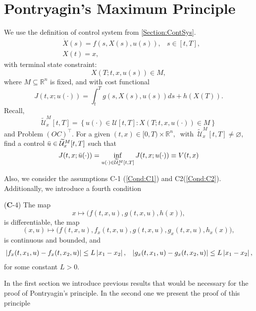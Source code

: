 \chapter{Pontryagin's Maximum Principle}
    We use the definition of control system from \cref{Section:ContSys}.
    \begin{equation} \label{Eq;CtrlSys}
        \begin{aligned}
            &\Dot{X}(s) = f(s, X(s), u(s)), & s\in[t,T], \\
            &X(t) = x,
        \end{aligned}
    \end{equation}
    with terminal state constraint:
    $$
        X(T; t,x,u(s)) \in M,
    $$
    where $M \subseteq \mathbb{R}^{n}$ is fixed, and with cost functional
    $$
        J(t,x;u(\cdot)) = \int_{t}^{T} g(s, X(s), u(s))ds + h(X(T)).
    $$
    Recall,
    $$
        \widetilde{\mathcal{U}}_{x}^{M}[t,T] = \left\{ u(\cdot) \in \mathcal{U}[t,T] : %
        X(T; t,x,u(\cdot)) \in M \right\}
    $$
    and
    Problem $(OC)^\top$. For a given $(t,x) \in [0,T) \times \mathbb{R}^{n}, \ $ %
    with $ \ \widetilde{\mathcal{U}}_{x}^{M}[t,T] \neq \varnothing$, find a control %
    $\Bar{u} \in \widetilde{\mathcal{U}}_{x}^{M}[t,T]$ such that 
    \begin{equation*}
        J(t,x; \Bar{u}(\cdot)) = \inf_{u(\cdot) \in %
        \widetilde{\mathcal{U}}_{x}^{M}[t,T] } %
        J(t,x; u(\cdot)) \equiv V(t,x)    
    \end{equation*}
    
    Also, we consider the assumptions C-1 (\ref{Cond:C1}) and C2(\ref{Cond:C2}).
    Additionally, we introduce a fourth condition
    \begin{asparaenum}
        \item[(\textbf{C}-4)] The map 
        \begin{equation*}
            x \mapsto \big(f(t,x,u), g(t,x,u), h(x) \big),
        \end{equation*}
        is differentiable, the map
        \begin{equation*}
            (x,u) \mapsto \big(f(t,x,u), f_x(t,x,u), g(t,x,u), g_x(t,x,u), h_x(x) \big),
        \end{equation*}
        is continuous and bounded, and
        \begin{align*}
            &\left\lvert f_{x}(t,x_1,u) - f_{x}(t,x_2,u)\right\rvert \leq L \left\lvert x_1 - x_2\right\rvert,
            &\left\lvert g_{x}(t,x_1,u) - g_{x}(t,x_2,u)\right\rvert \leq L \left\lvert x_1 - x_2\right\rvert,
        \end{align*}
        for some constant $L>0$.

    \end{asparaenum}
    In the first section we introduce previous results that would be necessary 
    for the proof of Pontryagin's principle. In the second one we present the proof
    of this principle


